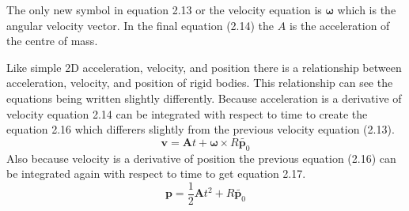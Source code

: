 The only new symbol in equation 2.13 or the velocity equation is $\boldsymbol{\omega}$ which is the angular velocity vector. In the final equation (2.14) the $A$ is the acceleration of the centre of mass.

Like simple 2D acceleration, velocity, and position there is a relationship between acceleration, velocity, and position of rigid bodies. This relationship can see the equations being written slightly differently.
Because acceleration is a derivative of velocity equation 2.14 can be integrated with respect to time to create the equation 2.16 which differers slightly from the previous velocity equation (2.13).
\begin{equation}
\mathbf{v}=\mathbf{A}t+\boldsymbol\omega\times{R}\tilde{\mathbf{p}_{0}}
\end{equation}
Also because velocity is a derivative of position the previous equation (2.16) can be integrated again with respect to time to get equation 2.17.
\begin{equation}
\mathbf{p}=\frac{1}{2}\mathbf{A}t^{2}+{R}\tilde{\mathbf{p}_{0}}
\end{equation}